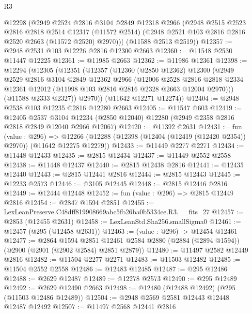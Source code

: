 \begin{lexlean}{R3}
\begin{coremodule}
      @12298
      (@2949
        @2524
        @2816
        @3104
        @2849
        @12318
        @2966
        (@2948
          @2515
          @2523
          @2816
          @2818
          @2514
          @12317
          (@11572 @2514)
          (@2948 @2521 @103 @2816 @2816 @2520 @2663 (@11572 @2520) @2970)))
      (@11588 @2513 @2519))
@12357 := @2948 @2531 @103 @12226 @2816 @12300 @2663
@12360 := @11548 @2530 @11447 @12225
@12361 := @11985 @2663
@12362 := @11986 @12361
@12398 := @12294
    (@12305
      (@12351
        (@12357
          (@12360
            (@2850 @12362)
            @12300
            (@2949
              @2529
              @2816
              @3104
              @2849
              @12362
              @2966
              (@12006
                @2528
                @2816
                @2818
                @2334
                @12361
                @12012
                (@11998 @103 @2816 @2816 @2328 @2663 @12004 @2970)))
            (@11588 @2333 @2327))
          @2970))
      (@11642 @12271 @12274))
@12404 := @2948 @2538 @103 @12235 @2816 @12280 @2663
@12405 := @11547 @603
@12419 := @12405
    @2537
    @3104
    @12234
    (@2850 @12040)
    @12280
    (@2949 @2358 @2816 @2818 @2849 @12040 @2966 @12067)
@12420 := @11392 @2631
@12431 := fun (value : @296) =>
  @12266 (@12288 (@12398 (@12404 (@12419 (@12420 @2354)) @2970)) (@11642 @12275 @12279))
@12433 := @11449 @2277 @2271
@12434 := @11448 @12433
@12435 := @2815 @12434
@12437 := @11449 @2552 @2558
@12438 := @11448 @12437
@12440 := @2815 @12438 @2816
@12441 := @12435 @12440
@12443 := @2815 @12441 @2816
@12444 := @2815 @12443
@12445 := @12233 @2573
@12446 := @3105 @12445
@12448 := @2815 @12446 @2816
@12449 := @12444 @12448
@12452 := fun (value : @296) => @2815 @12449 @2816
@12454 := @2847 @1594 @2851
@12455 := LexLeanPreserve.C48dff819908669abc5fb26ba0b5334ce.R3.__fits_27
@12457 := @2853 (@12455 @2631)
@12458 := LexLeanStd.Sha256.smallSigma0
@12461 := @12457 (@295 (@12458 @2631))
@12463 := (value : @296) -> @12454 @12461
@12477 := @2864
    @1594
    @2851
    @12461
    @2584
    @2880
    (@2884 (@2894 @1594))
    (@2900 (@2901 (@2902 @2584) @2851 @2879))
@12480 := @11497 @2582 @12449 @2816
@12482 := @11504 @2277 @2271
@12483 := @11503 @12482
@12485 := @11504 @2552 @2558
@12486 := @12483 @12485
@12487 := @295 @12486
@12488 := @2629 @12487
@12489 := @12278 @2573
@12490 := @295 @12489
@12492 := @2629 @12490 @2663
@12498 := @12480 (@12488 @12492) (@295 (@11503 @12486 @12489))
@12504 := @2948 @2569 @2581 @12443 @12448 @12487 @12492
@12507 := @11497 @2568 @12441 @2816

\end{coremodule}
\end{lexlean}
